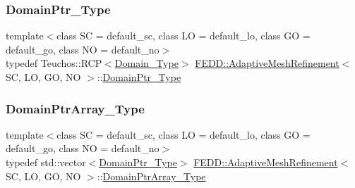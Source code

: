 \mbox{\label{classFEDD_1_1AdaptiveMeshRefinement_a98b097661d0e4c38e4182582078e2cd6}} 
\subsubsection{\texorpdfstring{Domain\+Ptr\+\_\+\+Type}{DomainPtr\_Type}}
{\footnotesize\ttfamily template$<$class SC = default\+\_\+sc, class LO = default\+\_\+lo, class GO = default\+\_\+go, class NO = default\+\_\+no$>$ \\
typedef Teuchos\+::\+R\+CP$<$\hyperlink{classFEDD_1_1AdaptiveMeshRefinement_a894158e6863753ca565eabb915e25d9a}{Domain\+\_\+\+Type}$>$ \hyperlink{classFEDD_1_1AdaptiveMeshRefinement}{F\+E\+D\+D\+::\+Adaptive\+Mesh\+Refinement}$<$ SC, LO, GO, NO $>$\+::\hyperlink{classFEDD_1_1AdaptiveMeshRefinement_a98b097661d0e4c38e4182582078e2cd6}{Domain\+Ptr\+\_\+\+Type}}

\mbox{\label{classFEDD_1_1AdaptiveMeshRefinement_a581823e939bbec9e9a52a23d59d5c06a}} 
\subsubsection{\texorpdfstring{Domain\+Ptr\+Array\+\_\+\+Type}{DomainPtrArray\_Type}}
{\footnotesize\ttfamily template$<$class SC = default\+\_\+sc, class LO = default\+\_\+lo, class GO = default\+\_\+go, class NO = default\+\_\+no$>$ \\
typedef std\+::vector$<$\hyperlink{classFEDD_1_1AdaptiveMeshRefinement_a98b097661d0e4c38e4182582078e2cd6}{Domain\+Ptr\+\_\+\+Type}$>$ \hyperlink{classFEDD_1_1AdaptiveMeshRefinement}{F\+E\+D\+D\+::\+Adaptive\+Mesh\+Refinement}$<$ SC, LO, GO, NO $>$\+::\hyperlink{classFEDD_1_1AdaptiveMeshRefinement_a581823e939bbec9e9a52a23d59d5c06a}{Domain\+Ptr\+Array\+\_\+\+Type}}


